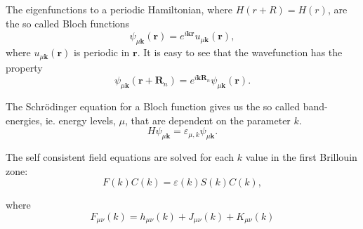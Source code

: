 \documentclass[12pt,a4paper,english]{beamer}
\newcommand{\mbf}{ \mathbf }
\begin{document}
\begin{frame}
  The eigenfunctions to a periodic Hamiltonian, where $H(r+R)=H(r)$, are the so called Bloch functions
  $$\psi_{\mu\mbf k}(\mbf r)=e^{i\mbf k\mbf r}u_{\mu\mbf k}(\mbf r),$$ where $u_{\mu\mbf k}(\mbf r)$ is periodic in $\mbf r.$ It is easy to see that the wavefunction has the property
  $$\psi_{\mu\mbf k}(\mbf r+\mbf R_n)=e^{i\mbf k\mbf R_n}\psi_{\mu\mbf k}(\mbf r).$$

  The Schr\"odinger equation for a Bloch function gives us the so called 
  band-energies, ie. energy levels, $\mu$, that are dependent on the 
  parameter $k.$
  $$H\psi_{\mu\mbf k}=\varepsilon_{\mu,k}\psi_{\mu\mbf k}.$$
\end{frame}

\begin{frame}

	   The self consistent field equations are solved 
	   for each $k$ value in the first Brillouin zone:
		\begin{equation*}
				F(k)C(k)=\varepsilon(k)S(k)C(k),
		\end{equation*}

		where
		\begin{equation}
		  F_{\mu\nu}(k)=h_{\mu\nu}(k)+J_{\mu\nu}(k) + K_{\mu\nu}(k)
		  \label{eq:kspacefock}
		\end{equation}


\end{frame}

%
\end{document}
